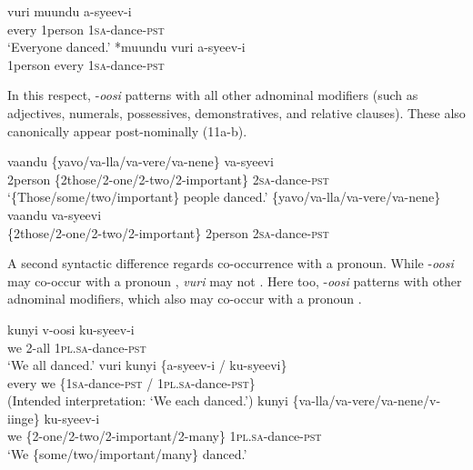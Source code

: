 \documentclass[output=paper]{langsci/langscibook}
\begin{document}
\ea\label{ex:landman:10}
\ea
\gll vuri    muundu  a-syeev-i    \\
     every    1person  1\textsc{sa}-dance-\textsc{pst}       \\
\glt ‘Everyone danced.’
\ex\label{ex:landman:10b}
\gll \textup{*}muundu  vuri    a-syeev-i  \\
     1person    every    1\textsc{sa}-dance-\textsc{pst}    \\
\z
\z

In this respect, -\textit{oosi} patterns with all other adnominal modifiers (such as adjectives, numerals, possessives, demonstratives, and relative clauses). These also canonically appear post-nominally (11a-b). 

\ea\label{ex:landman:11}
\ea
\gll vaandu  \{yavo/va-lla/va-vere/va-nene\}    va-syeevi  \\
     2person  \{2those/2-one/2-two/2-important\} 2\textsc{sa}-dance-\textsc{pst}\\
\glt ‘\{Those/some/two/important\} people danced.’
\ex\label{ex:landman:11b}
\gll *\{yavo/va-lla/va-vere/va-nene\}  vaandu   va-syeevi\\
     \{2those/2-one/2-two/2-important\}  2person  2\textsc{sa}-dance-\textsc{pst}\\
\z
\z

A second syntactic difference regards co-occurrence with a pronoun. While -\textit{oosi} may co-occur with a pronoun , \textit{vuri} may not . Here too, -\textit{oosi} patterns with other adnominal modifiers, which also may co-occur with a pronoun .

\ea\label{ex:landman:12}
\ea\label{ex:landman:12a}
\gll kunyi  v-oosi    ku-syeev-i      \\
     we  2-all    1\textsc{pl}.\textsc{sa}-dance-\textsc{pst}\\
\glt ‘We all danced.'
\ex\label{ex:landman:12b}
\gll *vuri  kunyi    \{a-syeev-i / ku-syeevi\}  \\
     every  we    \{1\textsc{sa}-dance-\textsc{pst} / 1\textsc{pl}.\textsc{sa}-dance-\textsc{pst\}}\\
\glt (Intended interpretation: ‘We each danced.’)
\ex\label{ex:landman:12c}
\gll kunyi \{va-lla/va-vere/va-nene/v-iinge\}     ku-syeev-i\\
     we    \{2-one/2-two/2-important/2-many\} 1\textsc{pl}.\textsc{sa}-dance-\textsc{pst}\\
\glt ‘We \{some/two/important/many\} danced.’
\z
\z
\end{document}
